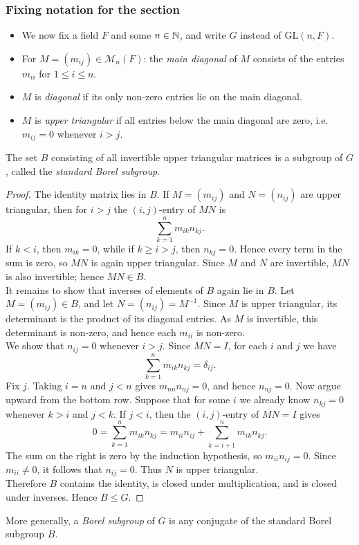 \documentclass[../Odyssey_Project.tex]{subfiles}
\begin{document}
\subsubsection*{Fixing notation for the section}
\begin{itemize}
    \item We now fix a field $F$ and some $n \in \mathbb{N}$, and write $G$ instead of $\mathrm{GL}(n, F)$.
    \item For $M = (m_{ij}) \in \mathcal{M}_n(F)$: the \emph{main diagonal} of $M$ consists of the entries $m_{ii}$ for $1 \leq i \leq n$.
    \item $M$ is \emph{diagonal} if its only non-zero entries lie on the main diagonal.
    \item $M$ is \emph{upper triangular} if all entries below the main diagonal are zero, i.e.\ $m_{ij} = 0$ whenever $i > j$.
\end{itemize}

\begin{proposition}
\label{prop:4.3}
The set $B$ consisting of all invertible upper triangular matrices is a subgroup of $G$, called the \emph{standard Borel subgroup}.
\end{proposition}

\begin{proof}
The identity matrix lies in $B$. If $M=(m_{ij})$ and $N=(n_{ij})$ are upper triangular, then for $i>j$ the $(i,j)$-entry of $MN$ is
\[
    \sum_{k=1}^n m_{ik}n_{kj}.
\]
If $k<i$, then $m_{ik}=0$, while if $k\geq i>j$, then $n_{kj}=0$. Hence every term in the sum is zero, so $MN$ is again upper triangular. Since $M$ and $N$ are invertible, $MN$ is also invertible; hence $MN \in B$. \\
It remains to show that inverses of elements of $B$ again lie in $B$. Let $M=(m_{ij}) \in B$, and let $N=(n_{ij})=M^{-1}$. Since $M$ is upper triangular, its determinant is the product of its diagonal entries. As $M$ is invertible, this determinant is non-zero, and hence each $m_{ii}$ is non-zero. \\
We show that $n_{ij}=0$ whenever $i>j$. Since $MN=I$, for each $i$ and $j$ we have
\[
    \sum_{k=1}^n m_{ik}n_{kj}=\delta_{ij}.
\]
Fix $j$. Taking $i=n$ and $j<n$ gives $m_{nn}n_{nj}=0$, and hence $n_{nj}=0$. Now argue upward from the bottom row. Suppose that for some $i$ we already know $n_{kj}=0$ whenever $k>i$ and $j<k$. If $j<i$, then the $(i,j)$-entry of $MN=I$ gives
\[
    0=\sum_{k=1}^n m_{ik}n_{kj}=m_{ii}n_{ij}+\sum_{k=i+1}^n m_{ik}n_{kj}.
\]
The sum on the right is zero by the induction hypothesis, so $m_{ii}n_{ij}=0$. Since $m_{ii}\neq 0$, it follows that $n_{ij}=0$. Thus $N$ is upper triangular. \\
Therefore $B$ contains the identity, is closed under multiplication, and is closed under inverses. Hence $B \leq G$.
\end{proof}
More generally, a \emph{Borel subgroup} of $G$ is any conjugate of the standard Borel subgroup $B$.
\end{document}

